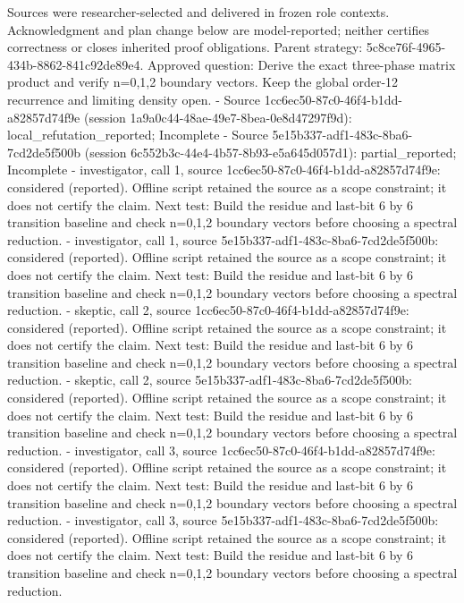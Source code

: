 \documentclass[11pt]{article}
\begin{document}
Sources were researcher-selected and delivered in frozen role contexts. Acknowledgment and plan change below are model-reported; neither certifies correctness or closes inherited proof obligations.
Parent strategy: 5c8ce76f-4965-434b-8862-841c92de89e4. Approved question: Derive the exact three-phase matrix product and verify n=0,1,2 boundary vectors. Keep the global order-12 recurrence and limiting density open.
- Source 1cc6ec50-87c0-46f4-b1dd-a82857d74f9e (session 1a9a0c44-48ae-49e7-8bea-0e8d47297f9d): local\_refutation\_reported; Incomplete
- Source 5e15b337-adf1-483c-8ba6-7cd2de5f500b (session 6c552b3c-44e4-4b57-8b93-e5a645d057d1): partial\_reported; Incomplete
- investigator, call 1, source 1cc6ec50-87c0-46f4-b1dd-a82857d74f9e: considered (reported). Offline script retained the source as a scope constraint; it does not certify the claim. Next test: Build the residue and last-bit 6 by 6 transition baseline and check n=0,1,2 boundary vectors before choosing a spectral reduction.
- investigator, call 1, source 5e15b337-adf1-483c-8ba6-7cd2de5f500b: considered (reported). Offline script retained the source as a scope constraint; it does not certify the claim. Next test: Build the residue and last-bit 6 by 6 transition baseline and check n=0,1,2 boundary vectors before choosing a spectral reduction.
- skeptic, call 2, source 1cc6ec50-87c0-46f4-b1dd-a82857d74f9e: considered (reported). Offline script retained the source as a scope constraint; it does not certify the claim. Next test: Build the residue and last-bit 6 by 6 transition baseline and check n=0,1,2 boundary vectors before choosing a spectral reduction.
- skeptic, call 2, source 5e15b337-adf1-483c-8ba6-7cd2de5f500b: considered (reported). Offline script retained the source as a scope constraint; it does not certify the claim. Next test: Build the residue and last-bit 6 by 6 transition baseline and check n=0,1,2 boundary vectors before choosing a spectral reduction.
- investigator, call 3, source 1cc6ec50-87c0-46f4-b1dd-a82857d74f9e: considered (reported). Offline script retained the source as a scope constraint; it does not certify the claim. Next test: Build the residue and last-bit 6 by 6 transition baseline and check n=0,1,2 boundary vectors before choosing a spectral reduction.
- investigator, call 3, source 5e15b337-adf1-483c-8ba6-7cd2de5f500b: considered (reported). Offline script retained the source as a scope constraint; it does not certify the claim. Next test: Build the residue and last-bit 6 by 6 transition baseline and check n=0,1,2 boundary vectors before choosing a spectral reduction.
\end{document}
